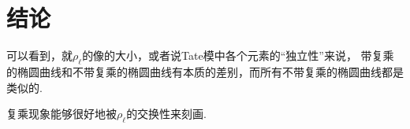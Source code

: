 \section{结论}

可以看到，就$\rho_{\ell}$的像的大小，或者说Tate模中各个元素的“独立性”来说，
带复乘的椭圆曲线和不带复乘的椭圆曲线有本质的差别，而所有不带复乘的椭圆曲线都是类似的.

复乘现象能够很好地被$\rho_{\ell}$的交换性来刻画.
